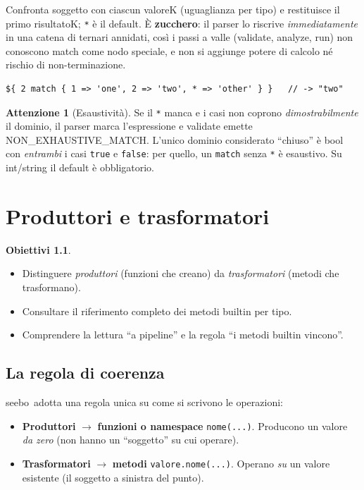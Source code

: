 \documentclass[11pt,a4paper]{book}
\let\code\lstinline
\newcommand{\ic}[1]{{\ttfamily #1}}
\theoremstyle{definition}
\newtheorem*{obiettivi}{Obiettivi}
\newtheorem*{attenzione}{Attenzione}
\newcommand{\seebo}{\textsf{seebo}}
\begin{document}
{{{{Confronta \ic{soggetto} con ciascun \ic{valoreK} (uguaglianza per tipo) e
restituisce il primo \ic{risultatoK}; \code|*| è il default. È \textbf{zucchero}:
il parser lo riscrive \emph{immediatamente} in una catena di ternari annidati,
così i passi a valle (\ic{validate}, \ic{analyze}, \ic{run}) non conoscono
\ic{match} come nodo speciale, e non si aggiunge potere di calcolo né rischio di
non-terminazione.

\begin{lstlisting}
${ 2 match { 1 => 'one', 2 => 'two', * => 'other' } }   // -> "two"
\end{lstlisting}

\begin{attenzione}[Esaustività]
Se il \code|*| manca e i casi non coprono \emph{dimostrabilmente} il dominio, il
parser marca l'espressione e \ic{validate} emette \ic{NON\_EXHAUSTIVE\_MATCH}.
L'unico dominio considerato ``chiuso'' è \ic{bool} con \emph{entrambi} i casi
\code|true| e \code|false|: per quello, un \code|match| senza \code|*| è
esaustivo. Su \ic{int}/\ic{string} il default è obbligatorio.
\end{attenzione}

\chapter{Produttori e trasformatori}
\label{ch:produttori}

\begin{obiettivi}
\begin{itemize}
  \item Distinguere \emph{produttori} (funzioni che creano) da \emph{trasformatori}
    (metodi che trasformano).
  \item Consultare il riferimento completo dei metodi builtin per tipo.
  \item Comprendere la lettura ``a pipeline'' e la regola ``i metodi builtin
    vincono''.
\end{itemize}
\end{obiettivi}

\section{La regola di coerenza}

\seebo\ adotta una regola unica su come si scrivono le operazioni:

\begin{itemize}
  \item \textbf{Produttori} $\rightarrow$ \textbf{funzioni o namespace}
    \code|nome(...)|. Producono un valore \emph{da zero} (non hanno un
    ``soggetto'' su cui operare).
  \item \textbf{Trasformatori} $\rightarrow$ \textbf{metodi}
    \code|valore.nome(...)|. Operano \emph{su} un valore esistente (il soggetto a
    sinistra del punto).
\end{itemize}

}}}}
\end{document}

